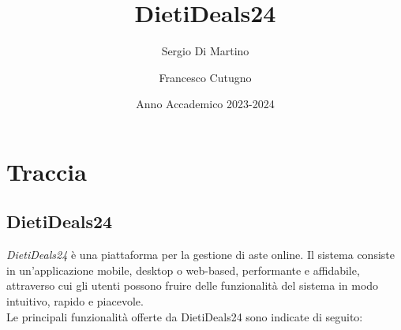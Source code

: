 \title{DietiDeals24}
\author{Sergio Di Martino \and Francesco Cutugno}
\date{Anno Accademico 2023-2024}

\chapter[Traccia: DietiDeals24]{Traccia}
    \section*{DietiDeals24}
        \textit{DietiDeals24} è una piattaforma per la gestione di aste online. Il sistema consiste in un’applicazione mobile, desktop o web-based, performante e affidabile, attraverso cui gli utenti possono fruire delle funzionalità del sistema in modo intuitivo, rapido e piacevole.\\
        Le principali funzionalità offerte da DietiDeals24 sono indicate di seguito:
